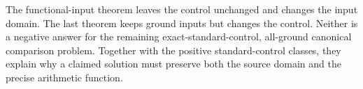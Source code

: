 The functional-input theorem leaves the control unchanged and changes the
input domain.  The last theorem keeps ground inputs but changes the control.
Neither is a negative answer for the remaining exact-standard-control,
all-ground canonical comparison problem.  Together with the positive
standard-control classes, they explain why a claimed solution must preserve
both the source domain and the precise arithmetic function.
